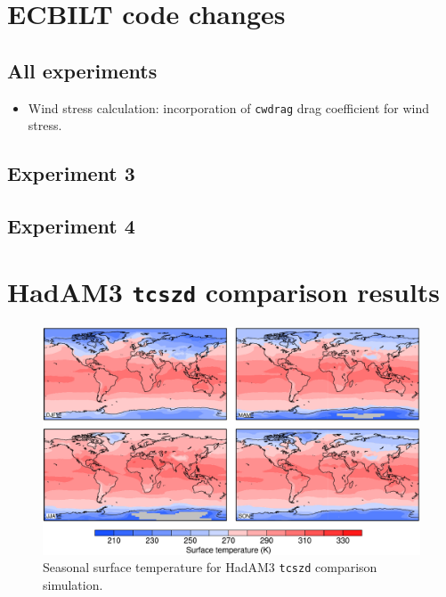 \documentclass[a4paper,11pt]{article}
\begin{document}
\section{ECBILT code changes}

\subsection*{All experiments}

\begin{itemize}
  \item{Wind stress calculation: incorporation of \texttt{cwdrag} drag
    coefficient for wind stress.}
\end{itemize}

\subsection*{Experiment 3}


\subsection*{Experiment 4}


\section{HadAM3 \texttt{tcszd} comparison results}
\label{sec:hadam3}

\begin{figure}
  \begin{center}
    \includegraphics[width=\textwidth]{../hadam3-comparison/plots/ts-plots}
  \end{center}
  \caption{Seasonal surface temperature for HadAM3 \texttt{tcszd}
    comparison simulation.}
  \label{fig:ts-hadam3}
\end{figure}
\end{document}

